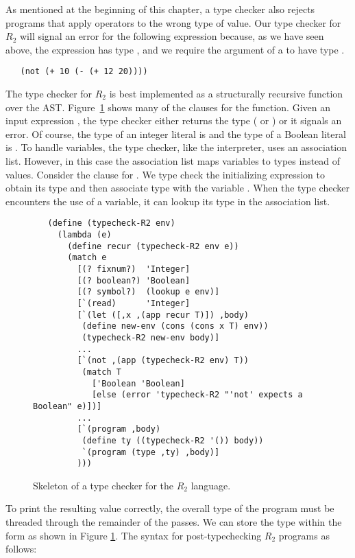 \documentclass[11pt]{book}
\begin{document}
As mentioned at the beginning of this chapter, a type checker also
rejects programs that apply operators to the wrong type of value. Our
type checker for $R_2$ will signal an error for the following
expression because, as we have seen above, the expression  has type , and we require the argument of a
 to have type .
\begin{lstlisting}
   (not (+ 10 (- (+ 12 20))))
\end{lstlisting}

The type checker for $R_2$ is best implemented as a structurally
recursive function over the AST. Figure~\ref{fig:type-check-R2} shows
many of the clauses for the  function.  Given an
input expression , the type checker either returns the type
( or ) or it signals an error.  Of course,
the type of an integer literal is  and the type of a
Boolean literal is .  To handle variables, the type
checker, like the interpreter, uses an association list. However, in
this case the association list maps variables to types instead of
values. Consider the clause for .  We type check the
initializing expression to obtain its type  and then associate
type  with the variable . When the type checker
encounters the use of a variable, it can lookup its type in the
association list.

\begin{figure}[tbp]
\begin{lstlisting}
   (define (typecheck-R2 env)
     (lambda (e)
       (define recur (typecheck-R2 env e))
       (match e
         [(? fixnum?)  'Integer]
         [(? boolean?) 'Boolean]
         [(? symbol?)  (lookup e env)]
         [`(read)      'Integer]
         [`(let ([,x ,(app recur T)]) ,body)
          (define new-env (cons (cons x T) env))
          (typecheck-R2 new-env body)]
         ...
         [`(not ,(app (typecheck-R2 env) T))
          (match T
            ['Boolean 'Boolean]
            [else (error 'typecheck-R2 "'not' expects a Boolean" e)])]
         ...
         [`(program ,body)
          (define ty ((typecheck-R2 '()) body))
          `(program (type ,ty) ,body)]
         )))
\end{lstlisting}
\caption{Skeleton of a type checker for the $R_2$ language.}
\label{fig:type-check-R2}
\end{figure}

To print the resulting value correctly, the overall type of the
program must be threaded through the remainder of the passes. We can
store the type within the  form as shown in Figure
\ref{fig:type-check-R2}. The syntax for post-typechecking $R_2$
programs as follows: \\
\end{document}
